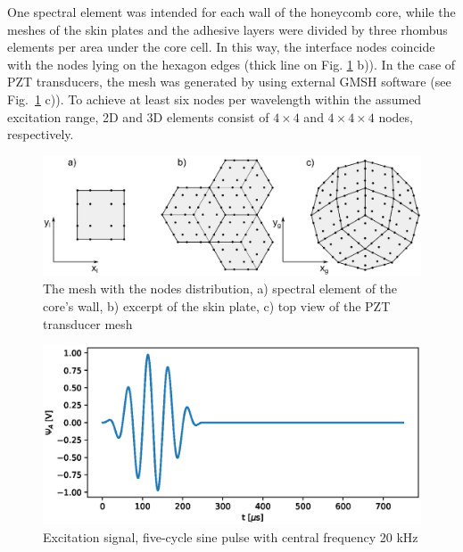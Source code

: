 \documentclass[a4paper,12pt]{article}
\begin{document}
{One spectral element was intended for each wall of the honeycomb core, while the meshes of the skin plates and the adhesive layers were divided by three rhombus elements per area under the core cell.
In this way, the interface nodes coincide with the nodes lying on the hexagon edges (thick line on Fig. \ref{fig:skin_mesh} b)).
In the case of PZT transducers, the mesh was generated by using external GMSH software \cite{geuzaine2009gmsh} (see Fig.~\ref{fig:skin_mesh} c)).
To achieve at least six nodes per wavelength within the assumed excitation range, 2D and 3D elements consist of \(4 \times 4\) and \(4 \times 4 \times 4\) nodes, respectively. 

\begin{figure}
	\begin{center}
		\includegraphics[width=1\linewidth]{../../../figures/eps/skin_mesh.eps}
	\end{center}
	\caption{The mesh with the nodes distribution, a) spectral element of the core's wall, b) excerpt of the skin plate, c) top view of the PZT transducer mesh}
	\label{fig:skin_mesh}
\end{figure}
\begin{figure}
	\begin{center}
		\includegraphics[width=1\linewidth]{../../../figures/eps/pulse20.eps}
	\end{center}
	\caption{Excitation signal, five-cycle sine pulse with central frequency 20 kHz}
	\label{fig:signal}
\end{figure}

}
\end{document}

